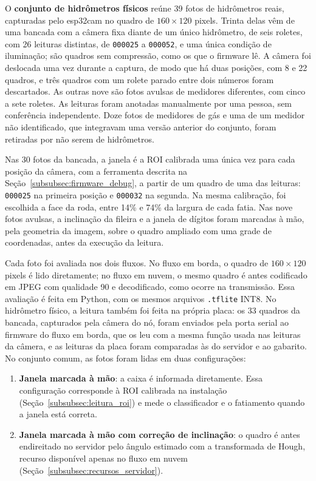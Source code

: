 O \textbf{conjunto de hidrômetros físicos} reúne 39 fotos de hidrômetros reais,
capturadas pelo \gls{esp32cam} no quadro de $160 \times 120$ pixels. Trinta delas vêm de
uma bancada com a câmera fixa diante de um único hidrômetro, de seis roletes, com 26
leituras distintas, de \texttt{000025} a \texttt{000052}, e uma única condição de
iluminação; são quadros sem compressão, como os que o firmware lê. A câmera foi deslocada
uma vez durante a captura, de modo que há duas posições, com 8 e 22 quadros, e três
quadros com um rolete parado entre dois números foram descartados. As outras nove são fotos
avulsas de medidores diferentes, com cinco a sete roletes. As leituras foram anotadas
manualmente por uma pessoa, sem conferência independente. Doze fotos de medidores de gás e
uma de um medidor não identificado, que integravam uma versão anterior do conjunto, foram
retiradas por não serem de hidrômetros.

Nas 30 fotos da bancada, a janela é a ROI calibrada uma única vez para cada posição da
câmera, com a ferramenta descrita na Seção~\ref{subsubsec:firmware_debug}, a partir de um
quadro de uma das leituras: \texttt{000025} na primeira posição e \texttt{000032} na
segunda. Na mesma calibração, foi escolhida a face da roda, entre 14\% e 74\% da largura de
cada fatia. Nas nove fotos avulsas, a inclinação da fileira e a janela de dígitos foram
marcadas à mão, pela geometria da imagem, sobre o quadro ampliado com uma grade de
coordenadas, antes da execução da leitura.

Cada foto foi avaliada nos dois fluxos. No fluxo em borda, o quadro de
$160 \times 120$ pixels é lido diretamente; no fluxo em nuvem, o mesmo quadro é antes
codificado em JPEG com qualidade 90 e decodificado, como ocorre na transmissão. Essa
avaliação é feita em Python, com os mesmos arquivos \texttt{.tflite} INT8. No hidrômetro
físico, a leitura também foi feita na própria placa: os 33 quadros da bancada, capturados
pela câmera do nó, foram enviados pela porta serial ao firmware do fluxo em borda, que os
leu com a mesma função usada nas leituras da câmera, e as leituras da placa foram
comparadas às do servidor e ao gabarito. No
conjunto comum, as fotos foram lidas em duas configurações:

\begin{enumerate}
    \item \textbf{Janela marcada à mão}: a caixa é informada diretamente. Essa configuração corresponde à ROI calibrada na instalação
    (Seção~\ref{subsubsec:leitura_roi}) e mede o classificador e o fatiamento quando a
    janela está correta.
    \item \textbf{Janela marcada à mão com correção de inclinação}: o quadro é antes
    endireitado no servidor pelo ângulo estimado com a transformada de Hough, recurso
    disponível apenas no fluxo em nuvem (Seção~\ref{subsubsec:recursos_servidor}).
\end{enumerate}

